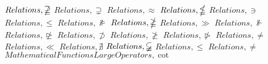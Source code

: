 \documentclass{article}
\begin{document}
\linebreak
\linebreak
$Relations,\nsupseteqq$
\linebreak
\linebreak
$Relations,\supsetneq$
\linebreak
\linebreak
$Relations,\approx$
\linebreak
\linebreak
$Relations,\nleqq$
\linebreak
\linebreak
$Relations,\ni$
\linebreak
\linebreak
$Relations,\le$
\linebreak
\linebreak
$Relations,\nVDash$
\linebreak
\linebreak
$Relations,\ngeqq$
\linebreak
\linebreak
$Relations,\gg$
\linebreak
\linebreak
$Relations,\nVdash$
\linebreak
\linebreak
$Relations,\ntrianglerighteq$
\linebreak
\linebreak
$Relations,\not\supset$
\linebreak
\linebreak
$Relations,\ngeq$
\linebreak
\linebreak
$Relations,\ntriangleright$
\linebreak
\linebreak
$Relations,\neq$
\linebreak
\linebreak
$Relations,\ll$
\linebreak
\linebreak
$Relations,\nexists$
\linebreak
\linebreak
$Relations,\varsubsetneqq$
\linebreak
\linebreak
$Relations,\leq$
\linebreak
\linebreak
$Relations,\ne$
\linebreak
\linebreak
$Mathematical Functions Large Operators,\cot$
\linebreak
\end{document}

